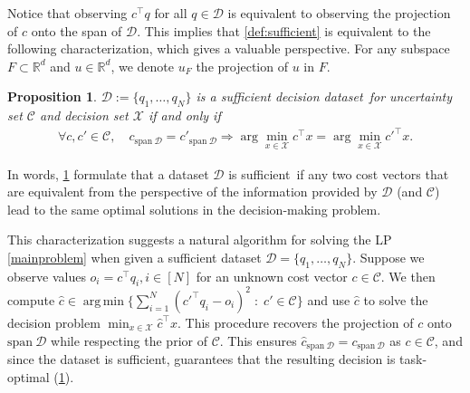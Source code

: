 \documentclass[11pt]{article}
\theoremstyle{plain}
\newtheorem{proposition}{Proposition}
\theoremstyle{definition}
\newtheorem{remark}{Remark}
\newcommand{\R}[0]{\mathbb R}
\newcommand{\Vect}{\mathrm{span}~}
\newcommand{\dataset}[0]{\mathcal D}
\newcommand{\sufficient}{sufficient decision dataset}
\newcommand{\suff}{sufficient}
\newcommand{\OB}[1]{\noindent{\textcolor{blue}{\{{\textbf{OB}:} #1\}}}}
\newcommand{\cX}{\mathcal{X}}
\newcommand{\cC}{\mathcal{C}}
\newcommand{\cD}{\mathcal{D}}
\DeclareMathOperator*{\argmin}{arg\,min}
\begin{document}

 Notice that observing $c^\top q$ for all $q\in \cD$ is equivalent to observing the projection of $c$ onto the span of $\cD$. This implies that \cref{def:sufficient} is equivalent to the following characterization, which gives a valuable perspective. For any subspace $F\subset \R^d$ and $u\in \R^d$, we denote $u_F$ the projection of $u$ in $F$.
\begin{proposition}\label{prop:sufficient:projections}
    $\dataset :=\{q_1,\dots,q_N\}$ is a \sufficient\ for uncertainty set $\cC$ and decision set $\cX$ if and only if 
    \begin{align*}
        \forall c,c'\in \cC, \quad c_{\Vect \cD}=c'_{\Vect \cD}\Longrightarrow \arg\min_{x\in \cX}c^\top x = \arg\min_{x\in \cX}c'^\top x.
    \end{align*}
\end{proposition}


In words, \cref{prop:sufficient:projections} formulate that a dataset $\cD$ is \suff\ if any two cost vectors that are equivalent from the perspective of the information provided by $\cD$ (and $\cC$) lead to the same optimal solutions in the decision-making problem.

This characterization suggests a natural algorithm for solving the LP \eqref{mainproblem} when given a sufficient dataset \(\mathcal{D} = \{q_1, \ldots, q_N\}\).
Suppose we observe values \(o_i = c^\top q_i, i\in [N]\) for an unknown cost vector \(c \in \mathcal{C}\). We then compute $\hat{c} \in \argmin \{ \sum_{i=1}^{N} (c'^\top q_i - o_i)^2 \; : \; c' \in \mathcal{C} \}$ and use \(\hat{c}\) to solve the decision problem \(\min_{x \in \mathcal{X}} \hat{c}^\top x\). This procedure recovers the projection of \(c\) onto \(\Vect \mathcal{D}\) while respecting the prior of \(\mathcal{C}\). This ensures \( \hat{c}_{\Vect \mathcal{D}} = c_{\Vect \mathcal{D}} \) as $c \in \cC$, and since the dataset is sufficient, guarantees that the resulting decision is task-optimal (\cref{prop:sufficient:projections}).
\end{document}
